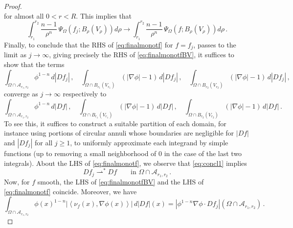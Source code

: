 \documentclass[a4paper,reqno,11pt]{amsart}
\newcommand{\weakto}{\rightharpoonup}
\newcommand{\ra}{\rightarrow}
\newcommand{\cA}{\mathcal{A}}
\begin{document}
\begin{proof}
\begin{equation*}
		\end{equation*}
		for almost all $0<r<R$. This implies that
		\begin{equation*}
			\int_{r_{1}}^{r_{2}} \dfrac{n-1}{\rho^{n}} \, \Psi_{\Omega}(f_j;B_{\rho}(V_{\rho})) d\rho \to \int_{r_{1}}^{r_{2}} \dfrac{n-1}{\rho^{n}} \, \Psi_{\Omega}(f;B_{\rho}(V_{\rho})) d\rho \, .
		\end{equation*}
		Finally, to conclude that the RHS of \eqref{eq:finalmonotf} for $f = f_j$, passes to the limit as $j \ra \infty$, giving precisely the RHS of \eqref{eq:finalmonotfBV}, it suffices to show that the terms 
		\begin{equation*}
			\int_{\Omega \cap \cA_{r_1,r_2}} \phi^{1-n} \, d |Df_j|\,, \quad  \int_{\Omega \cap B_{r_1}(V_{r_1})} (|\nabla \phi|-1) \, d |Df_j|\,, \quad \int_{\Omega \cap B_{r_2}(V_{r_2})} (|\nabla \phi|-1) \, d |Df_j| \,,
		\end{equation*}
converge as $j \ra \infty$ respectively to
		\begin{equation*}
			\int_{\Omega \cap \cA_{r_1,r_2}} \phi^{1-n} \, d |Df| \,,\quad \int_{\Omega \cap B_{r_1}(V_{r_1})} (|\nabla \phi|-1) \, d |Df|\,, \quad \int_{\Omega \cap B_{r_2}(V_{r_2})} (|\nabla \phi|-1) \, d |Df| \, .
		\end{equation*}
To see this, it suffices to construct a suitable partition of each domain, for instance using portions of circular annuli whose boundaries are negligible for $|Df|$ and $|Df_j|$ for all $j \geq 1$, to uniformly approximate each integrand by simple functions (up to removing a small neighborhood of $0$ in the case of the last two integrals). About the LHS of \eqref{eq:finalmonotf}, we observe that \eqref{eq:concl1} implies
		\begin{equation*}
			Df_j \mathop\weakto^\ast Df \qquad \text{in $\Omega \cap \cA_{r_1,r_2} \, .$}
		\end{equation*}
		Now, for $f$ smooth, the LHS of \eqref{eq:finalmonotfBV} and the LHS of \eqref{eq:finalmonotf} coincide. Moreover, we have
		\begin{equation*}
			\int_{\Omega \cap \cA_{r_{1},r_{2}}} \phi(x)^{1-n} \left|\left\langle \nu_f(x), \nabla \phi(x) \right\rangle \right| \, d |Df|(x) = \left| \phi^{1-n} \nabla \phi  \cdot Df_j \right|(\Omega \cap \cA_{r_{1},r_{2}}) \, .
		\end{equation*}

\end{proof}
\end{document}
